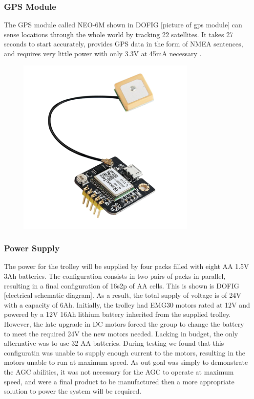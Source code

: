 \documentclass[11pt,landscape]{article}
\begin{document}
\begin{multicols}{3}
\subsubsection{GPS Module}
The GPS module called NEO-6M shown in DOFIG [picture of gps module] can sense
locations through the whole world by tracking 22 satellites. It takes 27 seconds
to start accurately, provides GPS data in the form of NMEA sentences, and
requires very little power with only 3.3V at 45mA necessary \cite{neo_gps}.

\begin{figure}[H]
    \begin{center}
        \includegraphics[]{gps_module.png}
        \label{fig:gps_module}
    \end{center}
\end{figure}


\subsubsection{Power Supply}
The power for the trolley will be supplied by four packs filled with eight AA
1.5V 3Ah batteries. The configuration consists in two pairs of packs in
parallel, resulting in a final configuration of 16s2p of AA cells. This is shown
is DOFIG [electrical schematic diagram]. As a result, the total supply of
voltage is of 24V with a capacity of 6Ah. Initially, the trolley had EMG30
motors rated at 12V and powered by a 12V 16Ah lithium battery inherited from the
supplied trolley. However, the late upgrade in DC motors forced the group to
change the battery to meet the required 24V the new motors needed. Lacking in
budget, the only alternative was to use 32 AA batteries. During testing we found
that this configuratin was unable to supply enough current to the motors,
resulting in the motors unable to run at maximum speed. As out goal was simply
to demonstrate the AGC abilities, it was not necessary for the AGC to operate at
maximum speed, and were a final product to be manufactured then a more
appropriate solution to power the system will be required.


\end{multicols}
\end{document}
